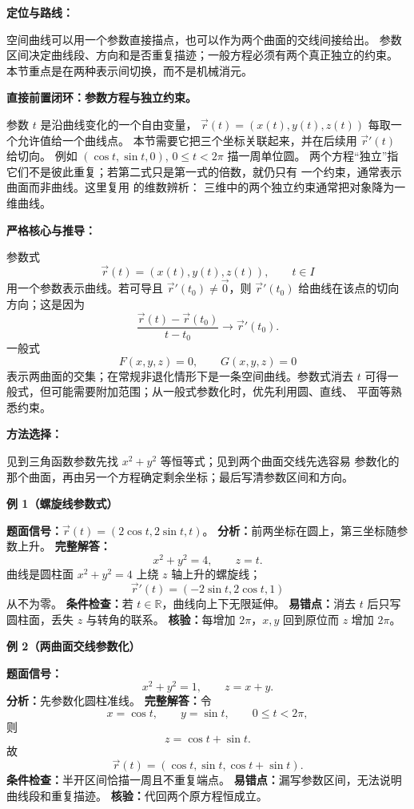 
\begin{knowledgeBox}
\textbf{定位与路线：}

空间曲线可以用一个参数直接描点，也可以作为两个曲面的交线间接给出。
参数区间决定曲线段、方向和是否重复描迹；一般方程必须有两个真正独立的约束。
本节重点是在两种表示间切换，而不是机械消元。

\textbf{直接前置闭环：参数方程与独立约束。}

参数 \(t\) 是沿曲线变化的一个自由变量，
\(\vec r(t)=(x(t),y(t),z(t))\) 每取一个允许值给一个曲线点。
本节需要它把三个坐标关联起来，并在后续用 \(\vec r'(t)\) 给切向。
例如 \((\cos t,\sin t,0)\), \(0\le t<2\pi\) 描一周单位圆。
两个方程“独立”指它们不是彼此重复；若第二式只是第一式的倍数，就仍只有
一个约束，通常表示曲面而非曲线。这里复用
的维数辨析：
三维中的两个独立约束通常把对象降为一维曲线。

\textbf{严格核心与推导：}

参数式
\[
\vec r(t)=(x(t),y(t),z(t)),\qquad t\in I
\]
用一个参数表示曲线。若可导且 \(\vec r'(t_0)\ne\vec0\)，则
\(\vec r'(t_0)\) 给曲线在该点的切向方向；这是因为
\[
\frac{\vec r(t)-\vec r(t_0)}{t-t_0}\to\vec r'(t_0).
\]
一般式
\[
F(x,y,z)=0,\qquad G(x,y,z)=0
\]
表示两曲面的交集；在常规非退化情形下是一条空间曲线。参数式消去 \(t\)
可得一般式，但可能需要附加范围；从一般式参数化时，优先利用圆、直线、
平面等熟悉约束。

\textbf{方法选择：}

见到三角函数参数先找 \(x^2+y^2\) 等恒等式；见到两个曲面交线先选容易
参数化的那个曲面，再由另一个方程确定剩余坐标；最后写清参数区间和方向。

\textbf{例 1（螺旋线参数式）}

\textbf{题面信号：}\(\vec r(t)=(2\cos t,2\sin t,t)\)。
\textbf{分析：}前两坐标在圆上，第三坐标随参数上升。
\textbf{完整解答：}
\[
x^2+y^2=4,\qquad z=t.
\]
曲线是圆柱面 \(x^2+y^2=4\) 上绕 \(z\) 轴上升的螺旋线；
\[
\vec r'(t)=(-2\sin t,2\cos t,1)
\]
从不为零。
\textbf{条件检查：}若 \(t\in\mathbb R\)，曲线向上下无限延伸。
\textbf{易错点：}消去 \(t\) 后只写圆柱面，丢失 \(z\) 与转角的联系。
\textbf{核验：}每增加 \(2\pi\)，\(x,y\) 回到原位而 \(z\) 增加 \(2\pi\)。

\textbf{例 2（两曲面交线参数化）}

\textbf{题面信号：}
\[
x^2+y^2=1,\qquad z=x+y.
\]
\textbf{分析：}先参数化圆柱准线。
\textbf{完整解答：}令
\[
x=\cos t,\qquad y=\sin t,\qquad 0\le t<2\pi,
\]
则
\[
z=\cos t+\sin t.
\]
故
\[
\vec r(t)=(\cos t,\sin t,\cos t+\sin t).
\]
\textbf{条件检查：}半开区间恰描一周且不重复端点。
\textbf{易错点：}漏写参数区间，无法说明曲线段和重复描迹。
\textbf{核验：}代回两个原方程恒成立。


\end{knowledgeBox}
